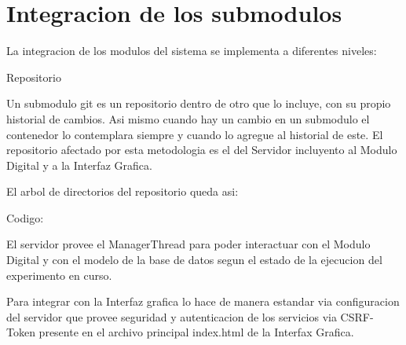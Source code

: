 \section{Integracion de los submodulos}

La integracion de los modulos del sistema se implementa a diferentes niveles:


Repositorio

Un submodulo git es un repositorio dentro de otro que lo incluye, con su propio historial de cambios. Asi mismo cuando hay un cambio en un submodulo el contenedor lo contemplara siempre y cuando lo agregue al historial de este.
El repositorio afectado por esta metodologia es el del Servidor incluyento al Modulo Digital y a la Interfaz Grafica.

El arbol de directorios del repositorio queda asi:


Codigo:

El servidor provee el ManagerThread para poder interactuar con el Modulo Digital y con el 
modelo de la base de datos segun el estado de la ejecucion del experimento en curso.

Para integrar con la Interfaz grafica lo hace de manera estandar via configuracion del servidor
que provee seguridad y autenticacion de los servicios via CSRF-Token presente en el archivo
principal index.html de la Interfax Grafica.

